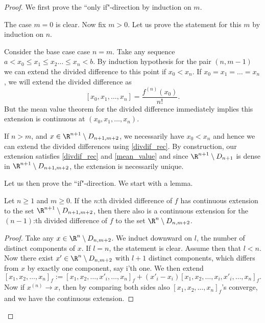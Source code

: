 \begin{proof}
	We first prove the ``only if"-direction by induction on $m$.

	The case $m = 0$ is clear. Now fix $m > 0$. Let us prove the statement for this $m$ by induction on $n$.

	Consider the base case case $n = m$. Take any sequence $a < x_{0} \leq x_{1} \leq x_{2} \ldots \leq x_{n} < b$. By induction hypothesis for the pair $(n, m - 1)$ we can extend the divided difference to this point if $x_{0} < x_{n}$. If $x_{0} = x_{1} = \ldots = x_{n}$, we will extend the divided difference as
	\[
		[x_{0}, x_{1}, \ldots, x_{n}] = \frac{f^{(n)}(x_{0})}{n!}.
	\]
	But the mean value theorem for the divided difference immediately implies this extension is continuous at $(x_{0}, x_{1}, \ldots, x_{n})$.

	If $n > m$, and $x \in \R^{n + 1} \setminus D_{n + 1, m + 2}$, we necessarily have $x_{0} < x_{n}$ and hence we can extend the divided differences using \ref{divdif_rec}. By construction, our extension satisfies \ref{divdif_rec} and \ref{mean_value} and since $\R^{n + 1} \setminus D_{n + 1}$ is dense in $\R^{n + 1} \setminus D_{n + 1, m + 2}$, the extension is necessarily unique.

	Let us then prove the ``if"-direction. We start with a lemma.

	\begin{lem}\label{smooth_lemma}
		Let $n \geq 1$ and $m \geq 0$. If the $n$:th divided difference of $f$ has continuous extension to the set $\R^{n + 1} \setminus D_{n + 1, m + 2}$, then there also is a continuous extension for the $(n - 1)$:th divided difference of $f$ to the set $\R^{n} \setminus D_{n, m + 2}$. 
	\end{lem}
	\begin{proof}
		Take any $x \in \R^{n} \setminus D_{n, m + 2}$. We induct downward on $l$, the number of distinct components of $x$. If $l = n$, the statement is clear. Assume then that $l < n$. Now there exist $x' \in \R^{n} \setminus D_{n, m + 2}$ with $l + 1$ distinct components, which differs from $x$ by exactly one component, say i'th one. We then extend
		\[
			[x_{1}, x_{2}, \ldots, x_{n}]_{f} := [x_{1}, x_{2}, \ldots, x'_{i}, \ldots, x_{n}]_{f} + (x'_i - x_{i}) [x_{1}, x_{2}, \ldots, x_{i}, x'_{i}, \ldots, x_{n}]_{f}.
		\]
		Now if $x^{(n)} \to x$, then by comparing both sides also $[x_{1}, x_{2}, \ldots, x_{n}]_{f}$'s converge, and we have the continuous extension.
	\end{proof}


\end{proof}
